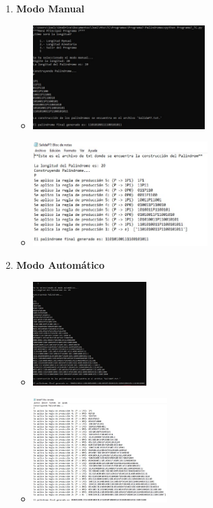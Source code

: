 \documentclass{article}
\begin{document}
	\begin{enumerate}
		\item \textbf{Modo Manual}
		\begin{itemize}
			\item \includegraphics[height = 4cm]{MM1.jpg}
			\item \includegraphics[height = 4cm]{MM2.jpg}
		\end{itemize}				
		\item \textbf{Modo Automático}
		\begin{itemize}
			\item \includegraphics[height = 4cm]{MA1.jpg}
			\item \includegraphics[height = 4cm]{MA2.jpg}
		\end{itemize}
	\end{enumerate}
\end{document}

